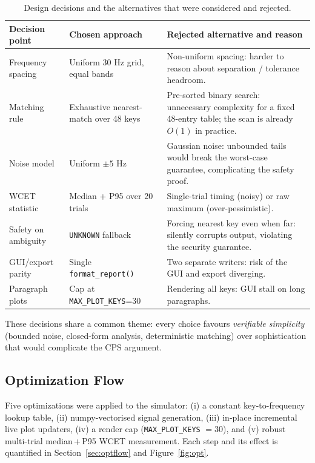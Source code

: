 \documentclass[11pt,a4paper]{article}
\newcommand{\Key}[1]{\texttt{#1}}
\begin{document}
\begin{table}[H]
    \centering
    \begin{tabular}{@{}p{4.2cm}p{4.6cm}p{4.6cm}@{}}
        \toprule
        \textbf{Decision point} & \textbf{Chosen approach} &
        \textbf{Rejected alternative and reason} \\
        \midrule
        Frequency spacing & Uniform 30 Hz grid,
            equal bands & Non-uniform spacing: harder to reason
            about separation / tolerance headroom. \\
        Matching rule & Exhaustive nearest-match over 48 keys &
            Pre-sorted binary search: unnecessary complexity
            for a fixed 48-entry table; the scan is already
            $O(1)$ in practice. \\
        Noise model & Uniform $\pm 5$ Hz & Gaussian noise: unbounded tails
            would break the worst-case guarantee, complicating
            the safety proof. \\
        WCET statistic & Median + P95 over 20 trials &
            Single-trial timing (noisy) or raw maximum
            (over-pessimistic). \\
        Safety on ambiguity & \Key{UNKNOWN} fallback &
            Forcing nearest key even when far: silently corrupts
            output, violating the security guarantee. \\
        GUI/export parity & Single \texttt{format\_report()} &
            Two separate writers: risk of the GUI and export
            diverging. \\
        Paragraph plots & Cap at
            \texttt{MAX\_PLOT\_KEYS}=30 &
            Rendering all keys: GUI stall on long
            paragraphs. \\
        \bottomrule
    \end{tabular}
    \caption{Design decisions and the alternatives that were considered and
             rejected.}
    \label{tab:decisions}
\end{table}

These decisions share a common theme: every choice favours \emph{verifiable
simplicity} (bounded noise, closed-form analysis, deterministic matching) over
sophistication that would complicate the CPS argument.

\subsection{Optimization Flow}

Five optimizations were applied to the simulator: (i) a constant
key-to-frequency lookup table, (ii) numpy-vectorised signal generation,
(iii) in-place incremental live plot updaters, (iv) a render cap
(\texttt{MAX\_PLOT\_KEYS} $= 30$), and (v) robust multi-trial median\,+\,P95
WCET measurement. Each step and its effect is quantified in
Section~\ref{sec:optflow} and Figure~\ref{fig:opt}.
\end{document}
